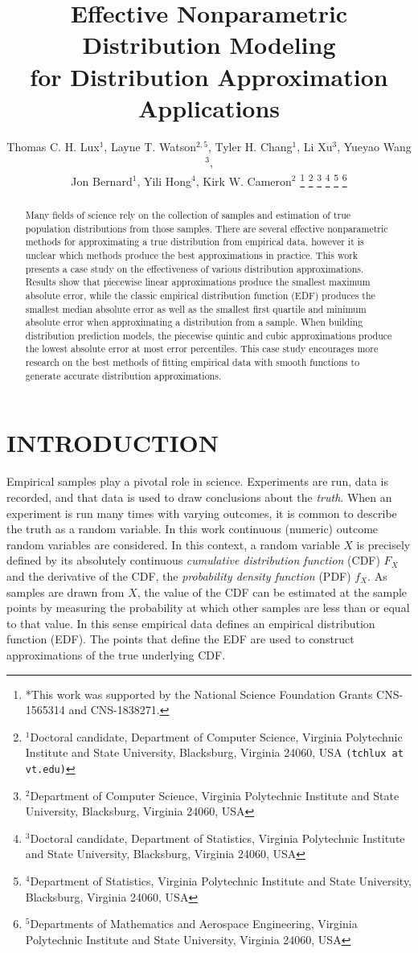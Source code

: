 \documentclass[letterpaper, 10 pt, conference]{IEEEtran}  %
\title{\LARGE \bf Effective Nonparametric Distribution Modeling \\ for Distribution Approximation Applications }
\author{Thomas C. H. Lux$^{1}$, Layne T. Watson$^{2,5}$, Tyler H. Chang$^{1}$, Li Xu$^{3}$, Yueyao Wang$^{3}$,\\ Jon Bernard$^{1}$, Yili Hong$^{4}$, Kirk W. Cameron$^{2}$%
\thanks{*This work was supported by the National Science Foundation Grants CNS-1565314 and CNS-1838271.}%
\thanks{$^{1}$Doctoral candidate, Department of Computer Science, Virginia Polytechnic Institute and State University, Blacksburg, Virginia 24060, USA {\tt\small (tchlux at vt.edu)}}%
\thanks{$^{2}$Department of Computer Science, Virginia Polytechnic Institute and State University, Blacksburg, Virginia 24060, USA}%
\thanks{$^{3}$Doctoral candidate, Department of Statistics, Virginia Polytechnic Institute and State University, Blacksburg, Virginia 24060, USA}%
\thanks{$^{4}$Department of Statistics, Virginia Polytechnic Institute and State University, Blacksburg, Virginia 24060, USA}%
\thanks{$^{5}$Departments of Mathematics and Aerospace Engineering, Virginia Polytechnic Institute and State University, Virginia 24060, USA}%
}
\begin{document}
\IEEEoverridecommandlockouts                              %


\maketitle

\begin{abstract}

Many fields of science rely on the collection of samples and estimation of true population distributions from those samples. There are several effective nonparametric methods for approximating a true distribution from empirical data, however it is unclear which methods produce the best approximations in practice. This work presents a case study on the effectiveness of various distribution approximations. Results show that piecewise linear approximations produce the smallest maximum absolute error, while the classic empirical distribution function (EDF) produces the smallest median absolute error as well as the smallest first quartile and minimum absolute error when approximating a distribution from a sample. When building distribution prediction models, the piecewise quintic and cubic approximations produce the lowest absolute error at most error percentiles. This case study encourages more research on the best methods of fitting empirical data with smooth functions to generate accurate distribution approximations.

\end{abstract}

\section{INTRODUCTION}
\label{sec:introduction}

Empirical samples play a pivotal role in science. Experiments are run, data is recorded, and that data is used to draw conclusions about the \textit{truth}. When an experiment is run many times with varying outcomes, it is common to describe the truth as a random variable. In this work continuous (numeric) outcome random variables are considered. In this context, a random variable $X$ is precisely defined by its absolutely continuous \textit{cumulative distribution function} (CDF) $F_X$ and the derivative of the CDF, the \textit{probability density function} (PDF) $f_X$. As samples are drawn from $X$, the value of the CDF can be estimated at the sample points by measuring the probability at which other samples are less than or equal to that value. In this sense empirical data defines an empirical distribution function (EDF). The points that define the EDF are used to construct approximations of the true underlying CDF.
\end{document}
